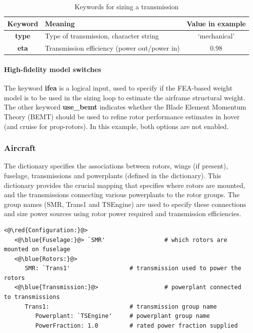   \begin{table}[H]
\begin{center}
	\caption{Keywords for sizing a transmission}
	\label{tbl:transmission_keywords}
    \begin{tabular}{| c | l | c |}
    \hline
    Keyword & Meaning & Value in example \\ 
    \hline
\textbf{type} & Type of transmission, character string & `mechanical' \\
\textbf{eta} & Transmission efficiency (power out/power in) & 0.98  \\
    \hline
  \end{tabular}
\end{center}
\end{table}
\vspace{-1.5cm}

\paragraph{High-fidelity model switches}
The keyword \textbf{ifea} is a logical input, used to specify if the FEA-based weight model is to be used in the sizing loop to estimate the airframe structural weight. The other keyword \textbf{use\_bemt} indicates whether the Blade Element Momentum Theory (BEMT) should be used to refine rotor performance estimates in hover (and cruise for prop-rotors). In this example, both options are not enabled. 

\subsubsection{Aircraft }
The  dictionary specifies the associations between rotors, wings (if present), fuselage, transmissions and powerplants (defined in the  dictionary). This dictionary provides the crucial mapping that specifies where rotors are mounted, and the transmissions connecting various powerplants to the rotor groups. The group names (SMR, Trans1 and TSEngine) are used to specify these connections and size power sources using rotor power required and transmission efficiencies. 

\begin{lstlisting}
<@\red{Configuration:}@>
   <@\blue{Fuselage:}@> `SMR'                 # which rotors are mounted on fuselage
   <@\blue{Rotors:}@>
      SMR: `Trans1'                 # transmission used to power the rotors
   <@\blue{Transmission:}@>                   # powerplant connected to transmissions
      Trans1:                       # transmission group name 
         Powerplant: `TSEngine'     # powerplant group name
         PowerFraction: 1.0         # rated power fraction supplied 
\end{lstlisting}

